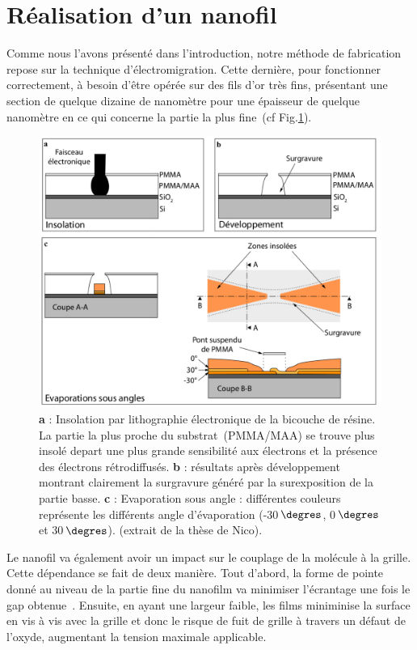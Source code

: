 \section{Réalisation d'un nanofil}
Comme nous l'avons présenté dans l'introduction, notre méthode de fabrication repose sur la technique d'électromigration. Cette dernière, pour fonctionner correctement, à besoin d'\^etre opérée sur des fils d'or très fins, présentant une section de quelque dizaine de nanomètre pour une épaisseur de quelque nanomètre en ce qui concerne la partie la plus fine~(cf Fig.\ref{EvapAngle}). 

\begin{figure}[h!]
\centering \includegraphics[scale=0.45]{Fabrication/EvapAngle/EvapAngle.pdf}
\caption{\textbf{a} : Insolation par lithographie électronique de la bicouche de résine. La partie la plus proche du substrat~(PMMA/MAA) se trouve plus insolé depart une plus grande sensibilité aux électrons et la présence des électrons rétrodiffusés. \textbf{b} : résultats après développement montrant clairement la surgravure généré par la surexposition de la partie basse. \textbf{c} : Evaporation sous angle : différentes couleurs représente les différents angle d'évaporation (-30$\,\degres$, 0$\,\degres$ et 30$\,\degres$). (extrait de la thèse de Nico).}
\label{EvapAngle}
\end{figure}

Le nanofil va également avoir un impact sur le couplage de la molécule à la grille. Cette dépendance se fait de deux manière. Tout d'abord, la forme de pointe donné au niveau de la partie fine du nanofilm va minimiser l'écrantage une fois le gap obtenue~\cite{Datta2009}. Ensuite, en ayant une largeur faible, les films miniminise la surface en vis à vis avec la grille et donc le risque de fuit de grille à travers un défaut de l'oxyde, augmentant la tension maximale applicable.

